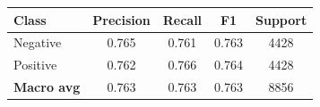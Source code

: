 \begin{tabular}{lcccc}
\toprule
Class & Precision & Recall & F1 & Support \\
\midrule
Negative & 0.765 & 0.761 & 0.763 & 4428 \\
Positive & 0.762 & 0.766 & 0.764 & 4428 \\
\midrule
\textbf{Macro avg} & 0.763 & 0.763 & 0.763 & 8856 \\
\bottomrule
\end{tabular}
